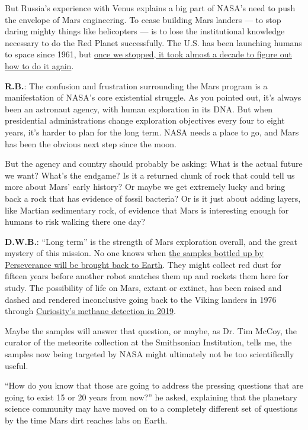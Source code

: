 But Russia's experience with Venus explains a big part of NASA's need to
push the envelope of Mars engineering. To cease building Mars landers
--- to stop daring mighty things like helicopters --- is to lose the
institutional knowledge necessary to do the Red Planet successfully. The
U.S. has been launching humans to space since 1961, but
\href{https://www.nytimes3xbfgragh.onion/2020/05/26/science/spacex-launch-nasa.html}{once
we stopped, it took almost a decade to figure out how to do it again}.

\textbf{R.B.}: The confusion and frustration surrounding the Mars
program is a manifestation of NASA's core existential struggle. As you
pointed out, it's always been an astronaut agency, with human
exploration in its DNA. But when presidential administrations change
exploration objectives every four to eight years, it's harder to plan
for the long term. NASA needs a place to go, and Mars has been the
obvious next step since the moon.

But the agency and country should probably be asking: What is the actual
future we want? What's the endgame? Is it a returned chunk of rock that
could tell us more about Mars' early history? Or maybe we get extremely
lucky and bring back a rock that has evidence of fossil bacteria? Or is
it just about adding layers, like Martian sedimentary rock, of evidence
that Mars is interesting enough for humans to risk walking there one
day?

\textbf{D.W.B.}: ``Long term'' is the strength of Mars exploration
overall, and the great mystery of this mission. No one knows when
\href{https://www.nytimes3xbfgragh.onion/2020/07/28/science/mars-sample-return-mission.html}{the
samples bottled up by Perseverance will be brought back to Earth}. They
might collect red dust for fifteen years before another robot snatches
them up and rockets them here for study. The possibility of life on
Mars, extant or extinct, has been raised and dashed and rendered
inconclusive going back to the Viking landers in 1976 through
\href{https://www.nytimes3xbfgragh.onion/2019/11/20/science/mars-oxygen-methane-curiosity-rover.html}{Curiosity's
methane detection in 2019}.

Maybe the samples will answer that question, or maybe, as Dr. Tim McCoy,
the curator of the meteorite collection at the Smithsonian Institution,
tells me, the samples now being targeted by NASA might ultimately not be
too scientifically useful.

``How do you know that those are going to address the pressing questions
that are going to exist 15 or 20 years from now?'' he asked, explaining
that the planetary science community may have moved on to a completely
different set of questions by the time Mars dirt reaches labs on Earth.

